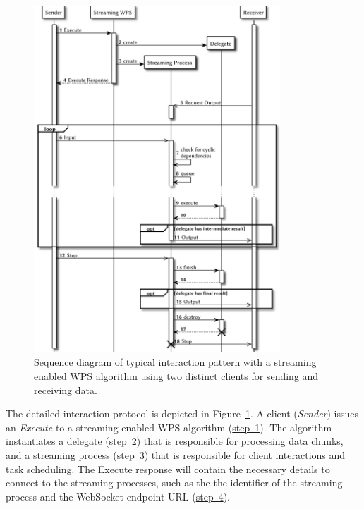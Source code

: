		\begin{figure}[!htb]
			\centering
			\includegraphics[width=0.82253521126760565\textwidth]{figures/sequence-diagramm-swps.pdf}
			\caption{\label{fig:sd:swps}Sequence diagram of typical interaction pattern with a streaming enabled WPS algorithm using two distinct clients for sending and receiving data.}
		\end{figure}

		The detailed interaction protocol is depicted in Figure~\ref{fig:sd:swps}. A client (\emph{Sender}) issues an \emph{Execute} to a streaming enabled WPS algorithm (\hyperref[fig:sd:swps]{step~1}). The algorithm instantiates a delegate (\hyperref[fig:sd:swps]{step~2}) that is responsible for processing data chunks, and a streaming process (\hyperref[fig:sd:swps]{step~3}) that is responsible for client interactions and task scheduling. The Execute response will contain the necessary details to connect to the streaming processes, such as the the identifier of the streaming process and the WebSocket endpoint URL (\hyperref[fig:sd:swps]{step~4}).

